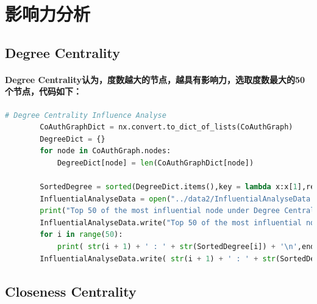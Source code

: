 \documentclass{ctexart}
\begin{document}
    \section{影响力分析}
    \subsection{Degree Centrality}
    \paragraph{
        Degree Centrality认为，度数越大的节点，越具有影响力，选取度数最大的50个节点，代码如下：\\
    }
    \begin{lstlisting}[language=python, basicstyle=\tiny,keywordstyle=\color{blue!100},commentstyle=\color{red!100!},frame=shadowbox, rulesepcolor=\color{red!20!green!20!blue!20}]
        # Degree Centrality Influence Analyse
        CoAuthGraphDict = nx.convert.to_dict_of_lists(CoAuthGraph)
        DegreeDict = {}
        for node in CoAuthGraph.nodes:
            DegreeDict[node] = len(CoAuthGraphDict[node])

        SortedDegree = sorted(DegreeDict.items(),key = lambda x:x[1],reverse = True)
        InfluentialAnalyseData = open("../data2/InfluentialAnalyseData.txt",'w')
        print("Top 50 of the most influential node under Degree Centrality: \n",end = '')
        InfluentialAnalyseData.write("Top 50 of the most influential node under Degree Centrality: \n")
        for i in range(50):
            print( str(i + 1) + ' : ' + str(SortedDegree[i]) + '\n',end = '')
        InfluentialAnalyseData.write( str(i + 1) + ' : ' + str(SortedDegree[i]) + '\n')
    \end{lstlisting}
    \subsection{Closeness Centrality}
\end{document}

